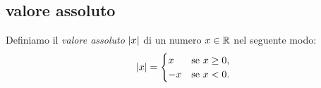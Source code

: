 %  
%
%
%

\subsection{valore assoluto}

\begin{definition}
\mymark{***}
Definiamo il \emph{valore assoluto}%
%
 ${\left|x\right|}$ di un numero $x\in {\mathbb R}$ nel seguente modo:
\[
{\left|x\right|} =
\begin{cases}
  x & \text{se $x\ge 0$}, \\
  -x & \text{se $x<0 $}.
\end{cases}
\]
\end{definition}
  
